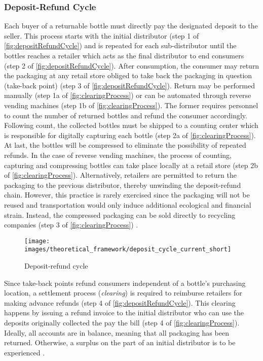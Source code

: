 \subsubsection{Deposit-Refund Cycle}
\label{sec:depositRefundCycle}
Each buyer of a returnable bottle must directly pay the designated deposit to the seller. This process starts with the initial distributor (step 1 of \autoref{fig:depositRefundCycle}) and is repeated for each sub-distributor until the bottles reaches a retailer which acts as the final distributor to end consumers (step 2 of \autoref{fig:depositRefundCycle}). After consumption, the consumer may return the packaging at any retail store obliged to take back the packaging in question (take-back point) (step 3 of \autoref{fig:depositRefundCycle}). Return may be performed manually (step 1a of \autoref{fig:clearingProcess}) or can be automated through reverse vending machines (step 1b of \autoref{fig:clearingProcess}). The former requires personnel to count the number of returned bottles and refund the consumer accordingly. Following count, the collected bottles must be shipped to a counting center which is responsible for digitally capturing each bottle (step 2a of \autoref{fig:clearingProcess}). At last, the bottles will be compressed to eliminate the possibility of repeated refunds. In the case of reverse vending machines, the process of counting, capturing and compressing bottles can take place locally at a retail store (step 2b of \autoref{fig:clearingProcess}). Alternatively, retailers are permitted to return the packaging to the previous distributor, thereby unwinding the deposit-refund chain. However, this practice is rarely exercised since the packaging will not be reused and transportation would only induce additional ecological and financial strain. Instead, the compressed packaging can be sold directly to recycling companies (step 3 of \autoref{fig:clearingProcess}) \cite[p.~16-17]{Hartlep2011Recycling} \cite{reiling}.  

\begin{figure}[hbt]
  \centering
  \texttt{[image: images/theoretical\_framework/deposit\_cycle\_current\_short]}
  \caption{Deposit-refund cycle \cite[p.~14]{Hartlep2011Recycling}}
  \label{fig:depositRefundCycle}
\end{figure}

Since take-back points refund consumers independent of a bottle’s purchasing location, a settlement process (\textit{clearing}) is required to reimburse retailers for making advance refunds (step 4 of \autoref{fig:depositRefundCycle}). This clearing happens by issuing a refund invoice to the initial distributor who can use the deposits originally collected the pay the bill (step 4 of \autoref{fig:clearingProcess}). Ideally, all accounts are in balance, meaning that all packaging has been returned. Otherwise, a surplus on the part of an initial distributor is to be experienced \cite[p.~17]{Hartlep2011Recycling}.

